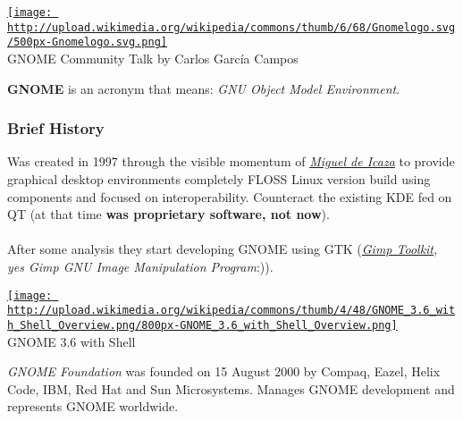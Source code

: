 
\begin{tabular}\href{http://upload.wikimedia.org/wikipedia/commons/thumb/6/68/Gnomelogo.svg/500px-Gnomelogo.svg.png}{
\texttt{[image: http://upload.wikimedia.org/wikipedia/commons/thumb/6/68/Gnomelogo.svg/500px-Gnomelogo.svg.png]}} \\ 
GNOME Community Talk by Carlos García Campos
\end{tabular}\textbf{GNOME} is an acronym that means: \textit{GNU Object Model Environment}.
\\

\subsubsection{ Brief History} Was created in 1997 through the visible momentum of \textit{\href{http://tirania.org/blog/}{Miguel de Icaza}} to provide graphical desktop environments completely FLOSS Linux version build using components and focused on interoperability. Counteract the existing KDE fed on QT (at that time \textbf{was proprietary software, not now}).
\\
\\ After some analysis they start developing GNOME using GTK (\textit{\href{http://www.gimp.org/}{Gimp Toolkit}, yes Gimp GNU Image Manipulation Program}\nolinebreak:)).
\\
\begin{tabular}\href{http://upload.wikimedia.org/wikipedia/commons/thumb/4/48/GNOME_3.6_with_Shell_Overview.png/800px-GNOME_3.6_with_Shell_Overview.png}{
\texttt{[image: http://upload.wikimedia.org/wikipedia/commons/thumb/4/48/GNOME\_3.6\_with\_Shell\_Overview.png/800px-GNOME\_3.6\_with\_Shell\_Overview.png]}} \\ 
GNOME 3.6 with Shell
\end{tabular}\textit{GNOME Foundation} was founded on 15 August 2000 by Compaq, Eazel, Helix Code, IBM, Red Hat and Sun Microsystems. Manages GNOME development and represents GNOME worldwide.
\\

